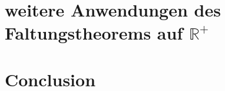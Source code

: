 %
%
%

\section{weitere Anwendungen des Faltungstheorems auf $\mathbb{R^+}$
\label{mellin:section:teil5}}


\section{Conclusion
\label{mellin:section:teil6}}


